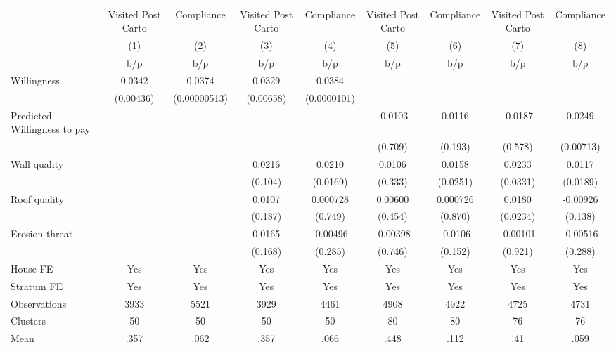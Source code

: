 {
\def\sym#1{\ifmmode^{#1}\else\(^{#1}\)\fi}
\begin{tabular}{l*{8}{c}}
\toprule
                &\multicolumn{1}{c}{Visited Post Carto}&\multicolumn{1}{c}{Compliance}&\multicolumn{1}{c}{Visited Post Carto}&\multicolumn{1}{c}{Compliance}&\multicolumn{1}{c}{Visited Post Carto}&\multicolumn{1}{c}{Compliance}&\multicolumn{1}{c}{Visited Post Carto}&\multicolumn{1}{c}{Compliance}\\
                &\multicolumn{1}{c}{(1)}&\multicolumn{1}{c}{(2)}&\multicolumn{1}{c}{(3)}&\multicolumn{1}{c}{(4)}&\multicolumn{1}{c}{(5)}&\multicolumn{1}{c}{(6)}&\multicolumn{1}{c}{(7)}&\multicolumn{1}{c}{(8)}\\
                &      b/p&      b/p&      b/p&      b/p&      b/p&      b/p&      b/p&      b/p\\
\midrule
Willingness     &   0.0342&   0.0374&   0.0329&   0.0384&         &         &         &         \\
                &(0.00436)&(0.00000513)&(0.00658)&(0.0000101)&         &         &         &         \\
Predicted Willingness to pay&         &         &         &         &  -0.0103&   0.0116&  -0.0187&   0.0249\\
                &         &         &         &         &  (0.709)&  (0.193)&  (0.578)&(0.00713)\\
Wall quality    &         &         &   0.0216&   0.0210&   0.0106&   0.0158&   0.0233&   0.0117\\
                &         &         &  (0.104)& (0.0169)&  (0.333)& (0.0251)& (0.0331)& (0.0189)\\
Roof quality    &         &         &   0.0107& 0.000728&  0.00600& 0.000726&   0.0180& -0.00926\\
                &         &         &  (0.187)&  (0.749)&  (0.454)&  (0.870)& (0.0234)&  (0.138)\\
Erosion threat  &         &         &   0.0165& -0.00496& -0.00398&  -0.0106& -0.00101& -0.00516\\
                &         &         &  (0.168)&  (0.285)&  (0.746)&  (0.152)&  (0.921)&  (0.288)\\
House FE        &      Yes&      Yes&      Yes&      Yes&      Yes&      Yes&      Yes&      Yes\\
Stratum FE      &      Yes&      Yes&      Yes&      Yes&      Yes&      Yes&      Yes&      Yes\\
\midrule
Observations    &     3933&     5521&     3929&     4461&     4908&     4922&     4725&     4731\\
Clusters        &       50&       50&       50&       50&       80&       80&       76&       76\\
Mean            &     .357&     .062&     .357&     .066&     .448&     .112&      .41&     .059\\
\bottomrule
\end{tabular}
}
